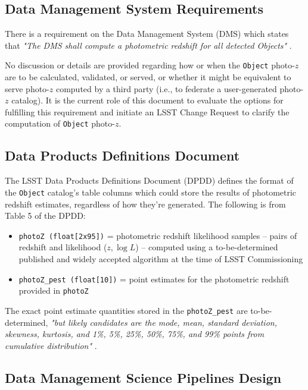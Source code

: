 \documentclass[DM,lsstdraft,toc]{lsstdoc}
\begin{document}
\subsection{Data Management System Requirements}\label{ssec:docs_dmsr}

There is a requirement on the Data Management System (DMS) which states that {\it "The DMS shall compute a photometric redshift for all detected Objects"} . 

No discussion or details are provided regarding how or when the {\tt Object} photo-$z$ are to be calculated, validated, or served, or whether it might be equivalent to serve photo-$z$ computed by a third party (i.e., to federate a user-generated photo-$z$ catalog).
It is the current role of this document to evaluate the options for fulfilling this requirement and initiate an LSST Change Request to clarify the computation of {\tt Object} photo-$z$.

\subsection{Data Products Definitions Document}\label{ssec:docs_dpdd}

The LSST Data Products Definitions Document (DPDD)  defines the format of the {\tt Object} catalog's table columns which could store the results of photometric redshift estimates, regardless of how they're generated. 
The following is from Table 5 of the DPDD:
\begin{itemize}%
\item \texttt{photoZ (float[2x95])} = photometric redshift likelihood samples -- pairs of redshift and likelihood ($z,\log{L}$) -- computed using a to-be-determined published and widely accepted algorithm at the time of LSST Commissioning
\item \texttt{photoZ\_pest (float[10])} = point estimates for the photometric redshift provided in {\tt photoZ}
\end{itemize}

The exact point estimate quantities stored in the \texttt{photoZ\_pest} are to-be-determined, {\it "but likely candidates are the mode, mean, standard deviation, skewness, kurtosis, and 1\%, 5\%, 25\%, 50\%, 75\%, and 99\% points from cumulative distribution"} . 

\subsection{Data Management Science Pipelines Design}\label{ssec:docs_ldm151}
\end{document}
